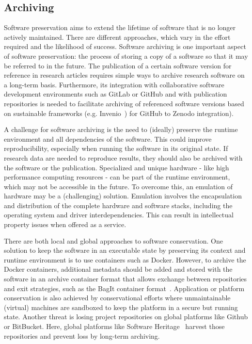 \documentclass[a4paper,num-refs,numbers,sort&compress]{de-rse}
\begin{document}
\subsection{Archiving}
Software preservation aims to extend the lifetime of software that is no longer actively maintained. There are different approaches, which vary in the effort required and the likelihood of success. Software archiving is one important aspect of software preservation: the process of storing a copy of a software so that it may be referred to in the future.
The publication of a certain software version for reference in research articles requires simple ways to archive research software on a long-term basis. Furthermore, its integration with collaborative software development environments such as GitLab or GitHub and with publication repositories is needed to facilitate archiving of referenced software versions based on sustainable frameworks (e.g. Invenio~\cite{Invenio}) for GitHub to Zenodo integration).

A challenge for software archiving is the need to (ideally) preserve the runtime environment and all dependencies of the software. This could improve reproducibility, especially when running the software in its original state. If research data are needed to reproduce results, they should also be archived with the software or the publication. Specialized and unique hardware - like high performance computing resources - can be part of the runtime environment, which may not be accessible in the future. To overcome this, an emulation of hardware may be a (challenging) solution. Emulation involves the encapsulation and distribution of the complete hardware and software stacks, including the operating system and driver interdependencies. This can result in intellectual property issues when offered as a service.

There are both local and global approaches to software conservation. One solution to keep the software in an executable state by preserving its context and runtime environment is to use containers such as Docker.
However, to archive the Docker containers, additional metadata should be added and stored with the software in an archive container format that allows exchange between repositories and exit strategies, such as the BagIt container format~\cite{kunze2018bagit}. Application or platform conservation is also achieved by conservational efforts where unmaintainable (virtual) machines are sandboxed to keep the platform in a secure but running state.
Another threat is losing project repositories on global platforms like Github or BitBucket. Here, global platforms like Software Heritage~\cite{swHeritage} harvest those repositories and prevent loss by long-term archiving.
\end{document}
